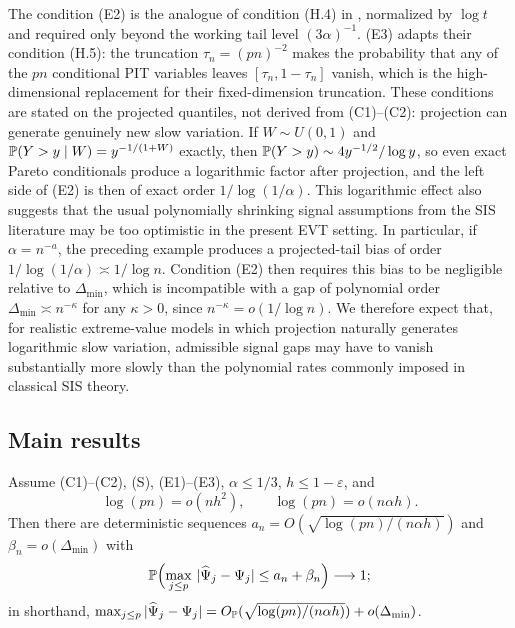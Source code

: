 The condition (E2) is the analogue of condition (H.4) in
\citet{gardesPodgorny2025}, normalized by $\log t$ and required only beyond
the working tail level $(3\alpha)^{-1}$. (E3)
adapts their condition (H.5): the truncation $\tau_n=(pn)^{-2}$ makes the
probability that any of the $pn$ conditional PIT variables leaves
$[\tau_n,1-\tau_n]$ vanish, which is the high-dimensional replacement for
their fixed-dimension truncation. These conditions are stated on the projected quantiles, not derived from
(C1)--(C2): projection can generate genuinely new slow variation. If
$W\sim U(0,1)$ and $\mathbb P(Y>y\mid W)=y^{-1/(1+W)}$ exactly, then
$\mathbb P(Y>y)\sim4y^{-1/2}/\log y$, so even exact Pareto conditionals produce
a logarithmic factor after projection, and the left side of (E2) is then
of exact order $1/\log(1/\alpha)$. This logarithmic effect also suggests that the usual polynomially shrinking signal assumptions from the SIS literature may be too optimistic in the present EVT setting. In particular, if $\alpha=n^{-a}$, the preceding example produces a projected-tail bias of order $1/\log(1/\alpha)\asymp1/\log n$. Condition (E2) then requires this bias to be negligible relative to $\Delta_{\min}$, which is incompatible with a gap of polynomial order $\Delta_{\min}\asymp n^{-\kappa}$ for any $\kappa>0$, since $n^{-\kappa}=o(1/\log n)$. We therefore expect that, for realistic extreme-value models in which projection naturally generates logarithmic slow variation, admissible signal gaps may have to vanish substantially more slowly than the polynomial rates commonly imposed in classical SIS theory.

\subsection{Main results}

\begin{theorem}\label{thm:score}
Assume (C1)--(C2), (S), (E1)--(E3), $\alpha\le1/3$,
$h\le1-\varepsilon$, and
\begin{equation}\label{eq:rate-cond}
 \log(pn)=o(nh^2),
 \qquad
 \log(pn)=o(n\alpha h).
\end{equation}
Then there are deterministic sequences
$a_n=O(\sqrt{\log(pn)/(n\alpha h)})$ and $\beta_n=o(\Delta_{\min})$ with
\[
 \mathbb P\Bigl(\max_{j\le p}\,|\widehat\Psi_j-\Psi_j|\le a_n+\beta_n\Bigr)
 \longrightarrow1;
\]
in shorthand,
$\max_{j\le p}|\widehat\Psi_j-\Psi_j|
=O_{\mathbb P}(\sqrt{\log(pn)/(n\alpha h)})+o(\Delta_{\min})$.
\end{theorem}

